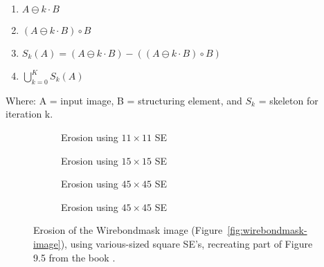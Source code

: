 \documentclass{article}
\begin{document}
\begin{enumerate}
    \item $A \ominus k \cdot B$
    \item $(A \ominus k \cdot B) \circ B$
    \item $S_k(A) = (A \ominus k \cdot B) - ((A \ominus k \cdot B) \circ B)$
    \item $\bigcup_{k=0}^{K}S_k(A)$
\end{enumerate}

Where: A = input image, B = structuring element, and $S_k$ = skeleton for iteration k.





\begin{figure}[H]
     \centering
     \begin{subfigure}[b]{0.45\textwidth}
         \centering
         
         \caption{Erosion using $11 \times 11$ SE}
         \label{fig:skeleton_input}
     \end{subfigure}
     \hfill
     \begin{subfigure}[b]{0.45\textwidth}
         \centering
         
         \caption{Erosion using $15 \times 15$ SE}
         \label{fig:book9.5figure-wirebondmask-image-15x15}
     \end{subfigure}
     \newline
     \begin{subfigure}[b]{0.45\textwidth}
         \centering
         
         \caption{Erosion using $45 \times 45$ SE}
         \label{fig:book9.5figure-wirebondmask-image-45x45}
     \end{subfigure}
     \hfill
     \begin{subfigure}[b]{0.45\textwidth}
         \centering
         
         \caption{Erosion using $45 \times 45$ SE}
         \label{fig:book9.5figure-wirebondmask-image-45x45}
     \end{subfigure}
     
    \caption{Erosion of the Wirebondmask image (Figure~\ref{fig:wirebondmask-image}), using various-sized square SE's, recreating part of Figure 9.5 from the book \citep{gonzalez2008digital}.}
    \label{fig:book9.5figure}
\end{figure}
\end{document}
